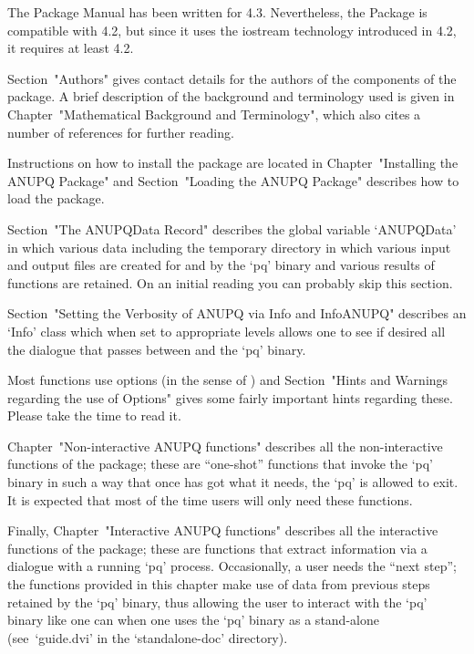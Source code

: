 \endlist


The  {\ANUPQ}  Package  Manual  has  been   written   for   {\GAP}   4.3.
Nevertheless, the {\ANUPQ} Package is compatible  with  {\GAP}  4.2,  but
since it uses the  iostream  technology  introduced  in  {\GAP}  4.2,  it
requires at least {\GAP} 4.2.

Section~"Authors" gives contact details for the authors of the components
of the {\ANUPQ} package.  A  brief  description  of  the  background  and
terminology  used  is  given  in  Chapter~"Mathematical  Background   and
Terminology", which  also  cites  a  number  of  references  for  further
reading.

Instructions on how to  install  the  {\ANUPQ}  package  are  located  in
Chapter~"Installing the ANUPQ Package"  and  Section~"Loading  the  ANUPQ
Package" describes how to load the {\ANUPQ} package.

Section~"The ANUPQData Record" describes the global variable  `ANUPQData'
in which various data including the temporary directory in which  various
input and output files are created for and by the `pq' binary and various
results of functions are retained. On an initial reading you can probably
skip this section.

Section~"Setting the Verbosity of ANUPQ via Info and InfoANUPQ" describes
an `Info' class which when set to appropriate levels allows one to see if
desired all the dialogue that passes between {\GAP} and the `pq' binary.

Most {\ANUPQ}  functions  use  options  (in  the  sense  of  {\GAP})  and
Section~"Hints and Warnings regarding the  use  of  Options"  gives  some
fairly important hints regarding these. Please take the time to read it.

Chapter~"Non-interactive   ANUPQ    functions"    describes    all    the
non-interactive functions of the {\ANUPQ} package; these are ``one-shot''
functions that invoke the `pq' binary in such a way that once {\GAP}  has
got what it needs, the `pq' is allowed to exit. It is expected that  most
of the time users will only need these functions.

Finally,  Chapter~"Interactive  ANUPQ  functions"   describes   all   the
interactive functions of the {\ANUPQ} package; these are  functions  that
extract  information  via  a  dialogue  with  a  running  `pq'   process.
Occasionally, a user needs the ``next step''; the functions  provided  in
this chapter make use of data from previous steps retained  by  the  `pq'
binary, thus allowing the user to interact with the `pq' binary like  one
can when one uses the `pq' binary as a  stand-alone  (see~`guide.dvi'  in
the `standalone-doc' directory).

